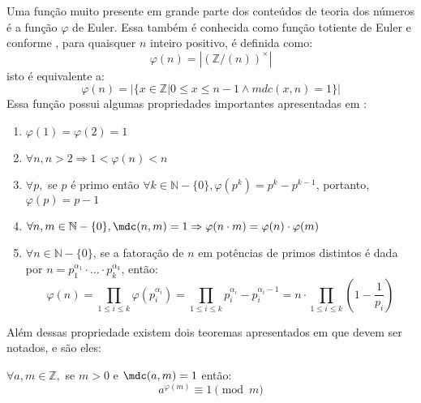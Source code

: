 Uma função muito presente em grande parte dos conteúdos de teoria dos números é a função $\varphi$ de Euler. Essa também é conhecida como função totiente de Euler e conforme \cite[p.~48]{book:2399854}, para quaisquer $n$ inteiro positivo, é definida como:
    \begin{equation} \label{def:phi}
        \varphi(n) = |(\mathbb{Z}/(n))^{\times}|
    \end{equation}
isto é equivalente a:
    \begin{equation}
        \varphi(n) = |\{x \in \mathbb{Z} | 0 \leq x \leq n-1 \land mdc(x,n) = 1 \}|
    \end{equation}
Essa função possui algumas propriedades importantes apresentadas em \cite[p.~48-49]{book:2399854}:
    \begin{enumerate}
    \item $\varphi(1) = \varphi(2) = 1$
    \item \label{item:prop-phi-2} $\forall n, n > 2 \Rightarrow 1 < \varphi(n) < n$
    \item \label{item:prop-phi-3} $\forall p,$ se $p$ é primo então $\forall k \in \mathbb{N} - \{0\}, \varphi(p^k) = p^k - p^{k-1}$, portanto, $\varphi(p) = p - 1$
    \item \label{item:prop-phi-4} $\forall n, m \in \mathbb{N} - \{0\}, \mdc(n, m) = 1 \Rightarrow \varphi(n \cdot m) = \varphi(n) \cdot \varphi(m) $
    \item \label{item:prop-phi-5} $\forall n \in \mathbb{N} - \{0\}$, se a fatoração de $n$ em potências de primos distintos é dada por $n = p_{1}^{\alpha_{1}} \cdot ... \cdot p_{k}^{\alpha_{k}}$, então:
        \begin{equation} \label{lema:phi-formula}
            \varphi(n) = \prod_{1 \leq i \leq k} \varphi(p_{i}^{\alpha_{i}}) = \prod_{1 \leq i \leq k} p_{i}^{\alpha_{i}} - p_{i}^{\alpha_{i} - 1} = n \cdot \prod_{1 \leq i \leq k} \left( 1 - \frac{1}{p_{i}} \right)
        \end{equation}
    \end{enumerate}

Além dessas propriedade existem dois teoremas apresentados em \cite[p.~49-50]{book:2399854} que devem ser notados, e são eles:

\begin{teorema}
\label{eq : euler-fermat}
$\forall a, m \in \mathbb{Z},$ se  $ m > 0$  e $\mdc(a,m) = 1$ então:
    \begin{equation*}
        a^{\varphi(m)} \equiv 1 \pmod{m}
    \end{equation*}
\end{teorema}

